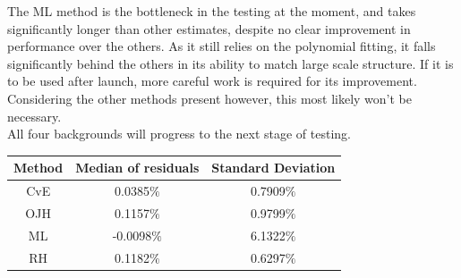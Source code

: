 \documentclass[10pt, a4paper]{article}
\begin{document}
The ML method is the bottleneck in the testing at the moment, and takes significantly longer than other estimates, despite no clear improvement in performance over the others. As it still relies on the polynomial fitting, it falls significantly behind the others in its ability to match large scale structure. If it is to be used after launch, more careful work is required for its improvement. Considering the other methods present however, this most likely won't be necessary.\\

All four backgrounds will progress to the next stage of testing.

\begin{table}[h!]
\begin{center}
	\begin{tabular}{c|c|c}
	\hline
	\textbf{Method}	& \textbf{Median of residuals }	& \textbf{Standard Deviation}\\ \hline\hline
	CvE 			& 0.0385$\%$ 				& 0.7909$\%$ \\
	OJH 			& 0.1157$\%$ 				& 0.9799$\%$\\
	ML 			& -0.0098$\%$ 				& 6.1322$\%$\\
	RH 			& 0.1182$\%$ 				& 0.6297$\%$\\
	\hline
	\end{tabular}
\end{center}	
\end{table}
\end{document}
